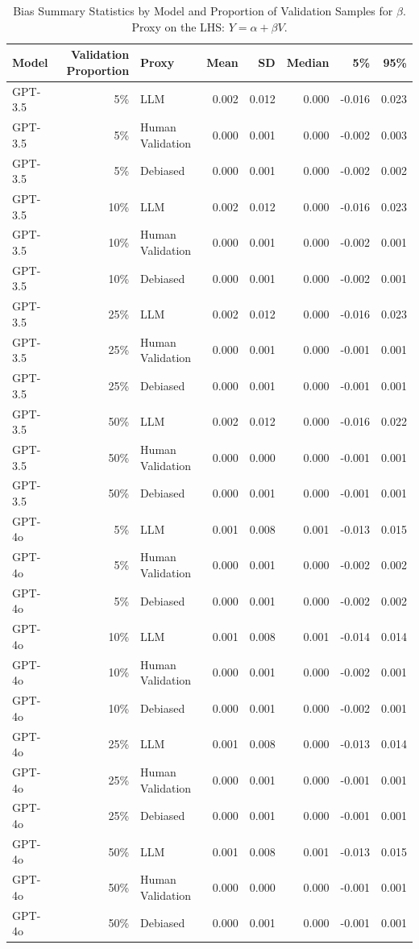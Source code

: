 \begin{table}

\caption{\label{tab:unnamed-chunk-2}Bias Summary Statistics by Model and Proportion of Validation Samples for $\beta$. Proxy on the LHS: $Y = \alpha + \beta V$.}
\centering
\begin{tabular}[t]{lrlrrrrr}
\toprule
Model & Validation Proportion & Proxy & Mean & SD & Median & 5\% & 95\%\\
\midrule
GPT-3.5 & 5\% & LLM & 0.002 & 0.012 & 0.000 & -0.016 & 0.023\\
GPT-3.5 & 5\% & Human Validation & 0.000 & 0.001 & 0.000 & -0.002 & 0.003\\
GPT-3.5 & 5\% & Debiased & 0.000 & 0.001 & 0.000 & -0.002 & 0.002\\
GPT-3.5 & 10\% & LLM & 0.002 & 0.012 & 0.000 & -0.016 & 0.023\\
GPT-3.5 & 10\% & Human Validation & 0.000 & 0.001 & 0.000 & -0.002 & 0.001\\
GPT-3.5 & 10\% & Debiased & 0.000 & 0.001 & 0.000 & -0.002 & 0.001\\
GPT-3.5 & 25\% & LLM & 0.002 & 0.012 & 0.000 & -0.016 & 0.023\\
GPT-3.5 & 25\% & Human Validation & 0.000 & 0.001 & 0.000 & -0.001 & 0.001\\
GPT-3.5 & 25\% & Debiased & 0.000 & 0.001 & 0.000 & -0.001 & 0.001\\
GPT-3.5 & 50\% & LLM & 0.002 & 0.012 & 0.000 & -0.016 & 0.022\\
GPT-3.5 & 50\% & Human Validation & 0.000 & 0.000 & 0.000 & -0.001 & 0.001\\
GPT-3.5 & 50\% & Debiased & 0.000 & 0.001 & 0.000 & -0.001 & 0.001\\
GPT-4o & 5\% & LLM & 0.001 & 0.008 & 0.001 & -0.013 & 0.015\\
GPT-4o & 5\% & Human Validation & 0.000 & 0.001 & 0.000 & -0.002 & 0.002\\
GPT-4o & 5\% & Debiased & 0.000 & 0.001 & 0.000 & -0.002 & 0.002\\
GPT-4o & 10\% & LLM & 0.001 & 0.008 & 0.001 & -0.014 & 0.014\\
GPT-4o & 10\% & Human Validation & 0.000 & 0.001 & 0.000 & -0.002 & 0.001\\
GPT-4o & 10\% & Debiased & 0.000 & 0.001 & 0.000 & -0.002 & 0.001\\
GPT-4o & 25\% & LLM & 0.001 & 0.008 & 0.000 & -0.013 & 0.014\\
GPT-4o & 25\% & Human Validation & 0.000 & 0.001 & 0.000 & -0.001 & 0.001\\
GPT-4o & 25\% & Debiased & 0.000 & 0.001 & 0.000 & -0.001 & 0.001\\
GPT-4o & 50\% & LLM & 0.001 & 0.008 & 0.001 & -0.013 & 0.015\\
GPT-4o & 50\% & Human Validation & 0.000 & 0.000 & 0.000 & -0.001 & 0.001\\
GPT-4o & 50\% & Debiased & 0.000 & 0.001 & 0.000 & -0.001 & 0.001\\
\bottomrule
\end{tabular}
\end{table}
